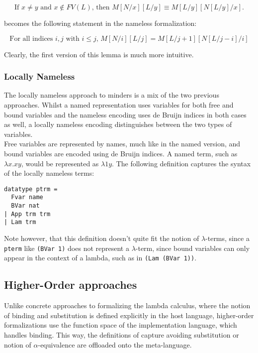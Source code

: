 \[\text{If }x \neq y\text{ and }x \not\in FV(L)\text{, then }
M[N/x][L/y] \equiv M[L/y][N[L/y]/x].\]

becomes the following statement in the nameless formalization:

\[\text{For all indices }i, j\text{ with }i \leq j\text{, }M[N/i][L/j] = M[L/j + 1][N[L/j - i]/i]\]

Clearly, the first version of this lemma is much more intuitive.

\subsubsection{Locally Nameless}\label{locally-nameless}

The locally nameless approach to minders is a mix of the two previous
approaches. Whilst a named representation uses variables for both free
and bound variables and the nameless encoding uses de Bruijn indices in
both cases as well, a locally nameless encoding distinguishes between
the two types of variables.\\
Free variables are represented by names, much like in the named version,
and bound variables are encoded using de Bruijn indices. A named term,
such as \(\lambda x. xy\), would be represented as \(\lambda 1y\). The
following definition captures the syntax of the locally nameless terms:

\begin{verbatim}
datatype ptrm =
  Fvar name
  BVar nat
| App trm trm
| Lam trm
\end{verbatim}

Note however, that this definition doesn't quite fit the notion of
\(\lambda\)-terms, since a \texttt{pterm} like \texttt{(BVar\ 1)} does
not represent a \(\lambda\)-term, since bound variables can only appear
in the context of a lambda, such as in \texttt{(Lam\ (BVar\ 1))}.

\subsection{Higher-Order approaches}\label{higher-order-approaches}

Unlike concrete approaches to formalizing the lambda calculus, where the
notion of binding and substitution is defined explicitly in the host
language, higher-order formalizations use the function space of the
implementation language, which handles binding. This way, the
definitions of capture avoiding substitution or notion of
\(\alpha\)-equivalence are offloaded onto the meta-language.

